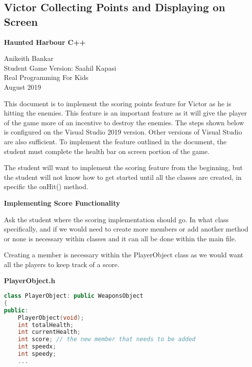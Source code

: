 \documentclass[11pt]{article}
\begin{document}
 


\begin{center}   



\section*{Victor Collecting Points and Displaying on Screen}

\bigskip
\bigskip
\bigskip  

\textbf{Haunted Harbour C++}

\bigskip
\bigskip
\bigskip 
Anikeith Bankar   
\\
\bigskip
Student Game Version: Saahil Kapasi
\\ 
\bigskip
Real Programming For Kids  
\bigskip 
\\
August 2019

\end{center}

\newpage 

This document is to implement the scoring points feature for Victor as he is hitting the enemies. This feature is an important feature as it will give the player of the game more of an incentive to destroy the enemies. The steps shown below is configured on the Visual Studio 2019 version. Other versions of Visual Studio are also sufficient. To implement the feature outlined in the document, the student must complete the health bar on screen portion of the game.   

\bigskip  
The student will want to implement the scoring feature from the beginning, but the student will not know how to get started until all the classes are created, in specific the onHit() method.  

\bigskip 

\begin{center}
\textbf{Implementing Score Functionality}
\end{center} 

\bigskip 
Ask the student where the scoring implementation should go. In what class specifically, and if we would need to create more members or add another method or none is necessary within classes and it can all be done within the main file. 

\bigskip

Creating a member is necessary within the PlayerObject class as we would want all the players to keep track of a score.  

\bigskip
\textbf{PlayerObject.h}
\begin{lstlisting}[language=C++]  
class PlayerObject: public WeaponsObject
{
public:
	PlayerObject(void);
	int totalHealth;
	int currentHealth;
	int score; // the new member that needs to be added
	int speedx;
	int speedy;  
	...
\end{lstlisting}
\end{document}

